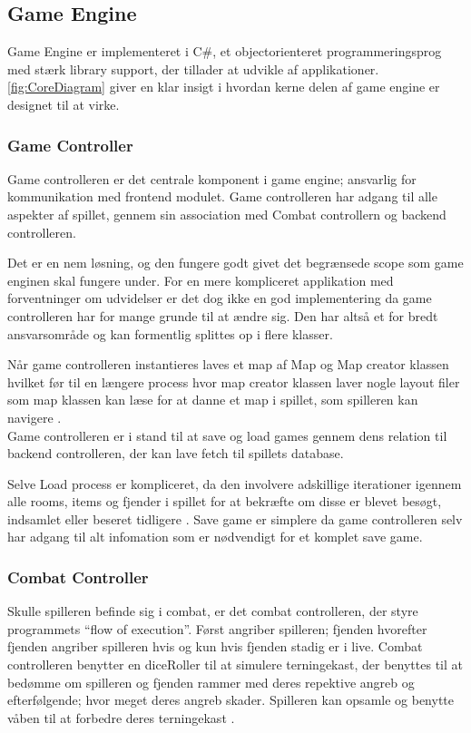 \subsection{Game Engine}
Game Engine er implementeret i C\#, et objectorienteret programmeringsprog
med stærk library support, der tillader at udvikle af applikationer. 
\autoref{fig:CoreDiagram} giver en klar insigt i hvordan kerne delen af
game engine er designet til at virke. 

\subsubsection{Game Controller}
Game controlleren er det centrale komponent i game engine; ansvarlig for 
kommunikation med frontend modulet. Game controlleren har adgang til alle
aspekter af spillet, gennem sin association med Combat controllern og 
backend controlleren.

Det er en nem løsning, og den fungere godt givet det begrænsede scope som 
game enginen skal fungere under.
For en mere kompliceret applikation med forventninger om udvidelser er det
dog ikke en god implementering da game controlleren har for mange grunde
til at ændre sig. Den har altså et for bredt ansvarsområde og kan formentlig
splittes op i flere klasser.

Når game controlleren instantieres laves et map af Map og Map creator klassen
hvilket før til en længere process hvor map creator klassen laver nogle
layout filer som map klassen kan læse for at danne et map i spillet, som 
spilleren kan navigere \parencite[Section 11.3.2][]{TekniskBilag}.\\

\noindent Game controlleren er i stand til at save og load games gennem 
dens relation til backend controlleren, der kan lave fetch til spillets
database.

Selve Load process er kompliceret, da den involvere adskillige iterationer
igennem alle rooms, items og fjender i spillet for at bekræfte om disse er
blevet besøgt, indsamlet eller beseret tidligere \parencite[Section 11.3.1]
[Figure 55]{TekniskBilag}.
Save game er simplere da game controlleren selv har adgang til alt infomation
som er nødvendigt for et komplet save game.

\subsubsection{Combat Controller}
Skulle spilleren befinde sig i combat, er det combat controlleren, der styre programmets
``flow of execution''. Først angriber spilleren; fjenden hvorefter fjenden angriber spilleren
hvis og kun hvis fjenden stadig er i live. Combat controlleren benytter en diceRoller til
at simulere terningekast, der benyttes til at bedømme om spilleren og fjenden rammer med
deres repektive angreb og efterfølgende; hvor meget deres angreb skader. Spilleren kan opsamle
og benytte våben til at forbedre deres terningekast \parencite[Section 10.3.2][]{TekniskBilag}. 

